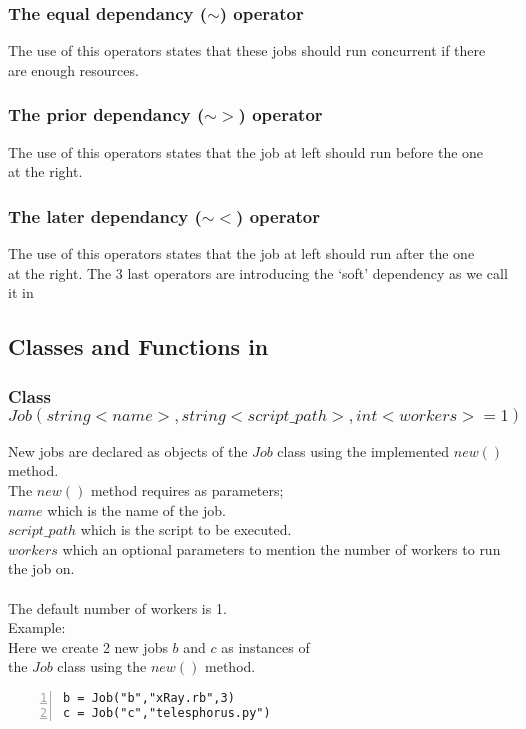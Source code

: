 \subsubsection*{The equal dependancy ($\sim$) operator}
The use of this operators states that these jobs should run concurrent if there\\
are enough resources.
\subsubsection*{The prior dependancy ($\sim>$) operator}
The use of this operators states that the job at left should run before the one\\
at the right.
\subsubsection*{The later dependancy ($\sim<$) operator}
The use of this operators states that the job at left should run after the one\\
at the right.
The 3 last operators are introducing the `soft' dependency as we call it in \lang{}\\
\subsection*{Classes and Functions in \lang{}}
\subsubsection*{Class $Job(string <name>, string <script\_path>, int <workers>=1)$}
New jobs are declared as objects of the $Job$ class using the implemented $new()$ method.\\
The $new()$ method requires as parameters;\\
$name$ which is the name of the job.\\
$script\_path$ which is the script to be executed.\\
$workers$ which an optional parameters to mention the number of workers to run the job on.\\\\
The default number of workers is 1.\\
Example:\\
Here we create 2 new jobs $b$ and $c$ as instances of \\the $Job$ class using the $new()$ method.
\begin{Verbatim}[numbers=left]
b = Job("b","xRay.rb",3)
c = Job("c","telesphorus.py")
\end{Verbatim}
